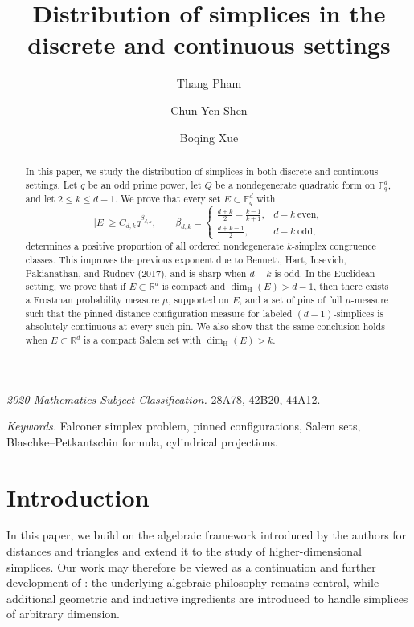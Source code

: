 \documentclass[11pt]{article}
\title{Distribution of simplices in the discrete and continuous settings}
\author{Thang Pham\and Chun-Yen Shen\and Boqing Xue}
\date{}
\theoremstyle{remark}
\numberwithin{equation}{section}
\newcommand{\1}{\mathbf 1}
\begin{document}
\maketitle
\begin{abstract}
In this paper, we study the distribution of simplices in both discrete and continuous settings. Let \(q\) be an odd prime power, let \(Q\) be a nondegenerate
quadratic form on \(\mathbb F_q^d\), and let \(2\leq k\leq d-1\).
We prove that every set \(E\subset\mathbb F_q^d\) with
\[
 |E|\geq C_{d,k}q^{\beta_{d,k}},
 \qquad
 \beta_{d,k}=
 \begin{cases}
 \displaystyle \frac{d+k}{2}-\frac{k-1}{k+1},
     & d-k\ \text{even},\\[2mm]
 \displaystyle \frac{d+k-1}{2},
     & d-k\ \text{odd},
 \end{cases}
\]
determines a positive proportion of all ordered nondegenerate
\(k\)-simplex congruence classes. This improves the previous exponent due to Bennett,
Hart, Iosevich, Pakianathan, and Rudnev (2017), and is sharp when \(d-k\) is odd. In the Euclidean setting, we prove that if \(E\subset\mathbb R^d\) is
compact and \(\dim_{\mathrm H}(E)>d-1\), then there exists a Frostman
probability measure \(\mu\), supported on \(E\), and a set of pins of
full \(\mu\)-measure such that the pinned distance
configuration measure for labeled \((d-1)\)-simplices is absolutely
continuous at every such pin. We also show that the same conclusion holds when \(E\subset\mathbb R^d\) is a compact Salem set with
\(\dim_{\mathrm H}(E)>k\). 
\end{abstract}

\noindent\textit{2020 Mathematics Subject Classification.}
28A78, 42B20, 44A12.
\par\smallskip\noindent
\textit{Keywords.}
Falconer simplex problem, pinned configurations, Salem sets,
Blaschke--Petkantschin formula, cylindrical projections.

\section{Introduction}
In this paper, we build on the algebraic framework introduced by the authors \cite{PSX} for distances and triangles and extend it to the study
of higher-dimensional simplices.  Our work may therefore be viewed as
a continuation and further development of \cite{PSX}: the underlying
algebraic philosophy remains central, while additional geometric and
inductive ingredients are introduced to handle simplices of arbitrary
dimension.
\end{document}

